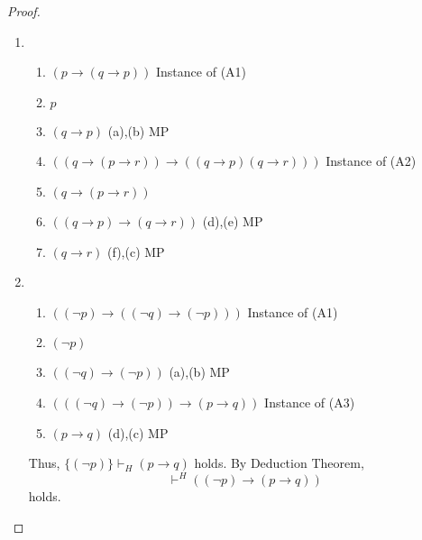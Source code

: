 \documentclass[12pt,a4paper]{article}
\theoremstyle{plain}
\theoremstyle{definition}
\begin{document}
\begin{proof}\
\begin{enumerate}
    \item 
        \begin{enumerate}
            \item $(p \to (q \to p))$ \hfill Instance of (A1)
            \item $p$ 
            \item $(q \to p)$ \hfill (a),(b) MP
            \item $((q \to (p \to r)) \to ((q \to p)(q \to r)))$ \hfill Instance of (A2)
            \item $(q \to (p \to r))$
            \item $((q \to p) \to (q \to r))$ \hfill (d),(e) MP
            \item $(q \to r)$ \hfill (f),(c) MP
        \end{enumerate}
        
    \item
        \begin{enumerate}
            \item $((\neg p) \to ((\neg q) \to (\neg p)))$ \hfill Instance of (A1)
            \item $(\neg p)$
            \item $((\neg q) \to (\neg p))$ \hfill (a),(b) MP
            \item $(((\neg q) \to (\neg p)) \to (p \to q))$ \hfill Instance of (A3)
            \item $(p \to q)$ \hfill (d),(c) MP
        \end{enumerate}
        Thus, $\{(\neg p)\} \vdash_H (p \to q)$ holds. By Deduction Theorem, \[ \vdash^H ( ( \neg p ) \rightarrow ( p \rightarrow q ) ) \] holds.
\end{enumerate}
\end{proof}

\end{document}
